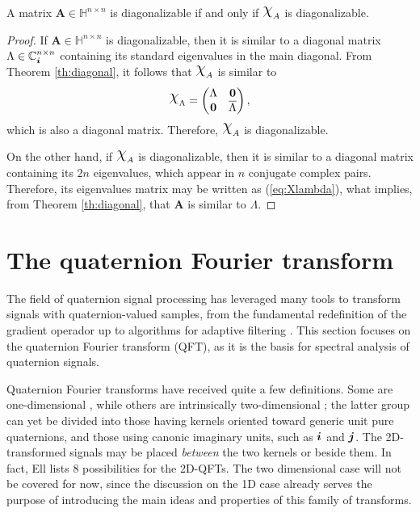\begin{corollary}
    \label{cor:diagonalizable}
    A matrix $  \mathbf{A} \in \mathbb{H}^{n \times n} $ is diagonalizable if and only if $ \rchi_A $ is diagonalizable.
\end{corollary}
\begin{proof}
    If $ \mathbf{A} \in \mathbb{H}^{n \times n} $ is diagonalizable, then it is similar to a diagonal matrix $ \Lambda \in \mathbb{C}^{n \times n}_{\boldsymbol{i}} $ containing its standard eigenvalues in the main diagonal. From Theorem \ref{th:diagonal}, it follows that $ \rchi_A $ is similar to
    \begin{equation}
        \label{eq:Xlambda}
        \rchi_{\Lambda} =
        \begin{pmatrix}
            \Lambda    & \mathbf{0}         \\
            \mathbf{0} & \overline{\Lambda}
        \end{pmatrix},
    \end{equation}
    which is also a diagonal matrix. Therefore, $ \rchi_A $ is diagonalizable.

    On the other hand, if $ \rchi_A $ is diagonalizable, then it is similar to a diagonal matrix containing its $ 2n $ eigenvalues, which appear in $ n $ conjugate complex pairs. Therefore, its eigenvalues matrix may be written as (\ref{eq:Xlambda}), what implies, from Theorem \ref{th:diagonal}, that $ \mathbf{A} $ is similar to $ \Lambda $.
\end{proof}

\section{The quaternion Fourier transform}
\label{sec:QFT}
The field of quaternion signal processing has leveraged many tools to transform signals with quaternion-valued samples, from the fundamental redefinition of the gradient operador \cite{jiang2014general} up to algorithms for adaptive filtering \cite{jiang2013frequency}. This section focuses on the quaternion Fourier transform (QFT), as it is the basis for spectral analysis of quaternion signals.

Quaternion Fourier transforms have received quite a few definitions. Some are one-dimensional \cite{flamant2017spectral}, while others are intrinsically two-dimensional \cite{guanlei2008fractional}; the latter group can yet be divided into those having kernels oriented toward generic unit pure quaternions, and those using canonic imaginary units, such as $ \boldsymbol{i} $ and $ \boldsymbol{j} $. The 2D-transformed signals may be placed \textit{between} the two kernels or beside them. In fact, Ell \cite[sec. 3.2]{ell2014quaternion} lists 8 possibilities for the 2D-QFTs. The two dimensional case will not be covered for now, since the discussion on the 1D case already serves the purpose of introducing the main ideas and properties of this family of transforms.

